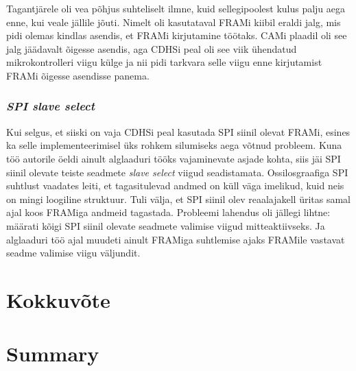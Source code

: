 \documentclass[12pt,a4paper]{article}
\begin{document}
Tagantjärele oli vea põhjus suhteliselt ilmne, kuid sellegipoolest kulus palju
aega enne, kui veale jällile jõuti. Nimelt oli kasutataval FRAMi kiibil eraldi
jalg, mis pidi olemas kindlas asendis, et FRAMi kirjutamine töötaks. CAMi
plaadil oli see jalg jäädavalt õigesse asendis, aga CDHSi peal oli see viik
ühendatud mikrokontrolleri viigu külge ja nii pidi tarkvara selle viigu enne
kirjutamist FRAMi õigesse asendisse panema.

\subsubsection{\textit{SPI slave select}}
Kui selgus, et siiski on vaja CDHSi peal kasutada SPI siinil olevat FRAMi,
esines ka selle implementeerimisel üks rohkem silumiseks aega võtnud probleem.
Kuna töö autorile öeldi ainult alglaaduri tööks vajaminevate asjade kohta, siis
jäi SPI siinil olevate teiste seadmete \textit{slave select} viigud
seadistamata. Ossilosgraafiga SPI suhtlust vaadates leiti, et tagasitulevad
andmed on küll väga imelikud, kuid neis on mingi loogiline struktuur. Tuli
välja, et SPI siinil olev reaalajakell üritas samal ajal koos FRAMiga andmeid
tagastada. Probleemi lahendus oli jällegi lihtne: määrati kõigi SPI siinil
olevate seadmete valimise viigud mitteaktiivseks. Ja alglaaduri töö ajal muudeti
ainult FRAMiga suhtlemise ajaks FRAMile vastavat seadme valimise viigu väljundit.

\section{Kokkuvõte}

\section{Summary}



\end{document}
